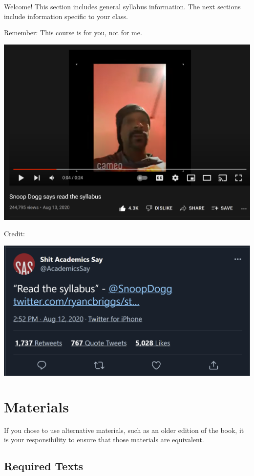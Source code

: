 Welcome! This section includes general syllabus information. The next sections include information specific to your class.

Remember: This course is for you, not for me.

\includegraphics[width=29.86in]{img/snoop}

Credit:

\includegraphics[width=19.31in]{img/AcademicsSaystatus}

\hypertarget{materials}{%
\section{Materials}\label{materials}}

If you chose to use alternative materials, such as an older edition of the book, it is your responsibility to ensure that those materials are equivalent.

\hypertarget{required-texts}{%
\subsection{Required Texts}\label{required-texts}}

